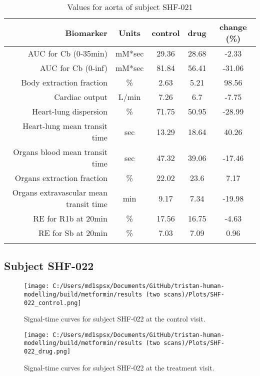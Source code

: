 \documentclass{epflreport}%
\begin{document}
\begin{longtable}{rcccc}%
\hline%
Biomarker&Units&control&drug&change (\%)\\%
\hline%
AUC for Cb (0{-}35min)&mM*sec&29.36&28.68&{-}2.33\\%
AUC for Cb (0{-}inf)&mM*sec&81.84&56.41&{-}31.06\\%
Body extraction fraction&\%&2.63&5.21&98.56\\%
Cardiac output&L/min&7.26&6.7&{-}7.75\\%
Heart{-}lung dispersion&\%&71.75&50.95&{-}28.99\\%
Heart{-}lung mean transit time&sec&13.29&18.64&40.26\\%
Organs blood mean transit time&sec&47.32&39.06&{-}17.46\\%
Organs extraction fraction&\%&22.02&23.6&7.17\\%
Organs extravascular mean transit time&min&9.17&7.34&{-}19.98\\%
RE for R1b at 20min&\%&17.56&16.75&{-}4.63\\%
RE for Sb at 20min&\%&7.03&7.09&0.96\\%
\hline%
\caption{Values for aorta of subject SHF-021} \\%
\end{longtable}%
\clearpage%
\subsection{Subject SHF{-}022}%
\label{subsec:SubjectSHF{-}022}%

%


\begin{figure}[h!]%
\centering%
\texttt{[image: C:/Users/md1spsx/Documents/GitHub/tristan-human-modelling/build/metformin/results (two scans)/Plots/SHF-022\_control.png]}%
\caption{Signal{-}time curves for subject SHF{-}022 at the control visit.}%
\end{figure}

%


\begin{figure}[h!]%
\centering%
\texttt{[image: C:/Users/md1spsx/Documents/GitHub/tristan-human-modelling/build/metformin/results (two scans)/Plots/SHF-022\_drug.png]}%
\caption{Signal{-}time curves for subject SHF{-}022 at the treatment visit.}%
\end{figure}
\end{document}
